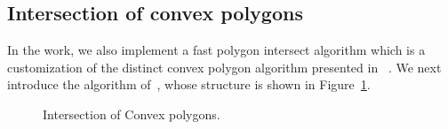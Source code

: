 \subsection{Intersection of convex polygons}

In the work, we also implement a fast polygon intersect algorithm which is a customization of the distinct convex polygon algorithm presented in ~\cite{ORourke:Intersection}. We next introduce the algorithm of~\cite{ORourke:Intersection}, whose structure is shown in Figure~\ref{alg:c-poly-inter}.

\begin{figure}[tb!]
\begin{center}
{\small
\begin{minipage}{3.36in}
\myhrule
\vspace{-1ex}
\vspace{-2ex}
\myhrule
\end{minipage}
}
\end{center}
\vspace{-2ex}
\caption{\small Intersection of Convex polygons.}
\label{alg:c-poly-inter}
\vspace{-2ex}
\end{figure}

